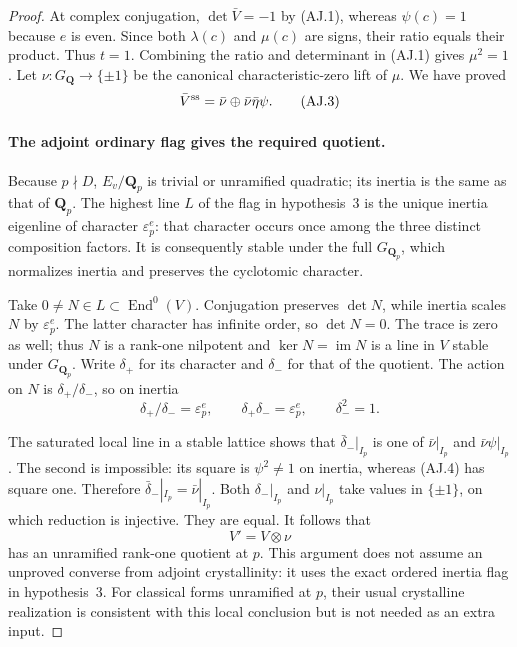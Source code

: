 \begin{proof}
At complex conjugation, $\det\bar V=-1$ by
(AJ.1), whereas $\psi(c)=1$ because $e$ is
even.  Since both $\lambda(c)$ and $\mu(c)$
are signs, their ratio equals their product.
Thus $t=1$.  Combining the ratio and determinant
in (AJ.1) gives $\mu^2=1$.
Let $\nu:G_{\mathbf Q}\to\{\pm1\}$ be the
canonical characteristic-zero lift of $\mu$.
We have proved
\[
          \bar V^{\rm ss}=
                  \bar\nu\oplus\bar\nu\bar\eta\psi.
                                                               \tag{AJ.3}
\]

\paragraph{The adjoint ordinary flag gives the required quotient.}
Because $p\nmid D$, $E_v/\mathbf Q_p$ is trivial
or unramified quadratic; its inertia is the same
as that of $\mathbf Q_p$.
The highest line $L$ of the flag in hypothesis~3
is the unique inertia eigenline of character
$\varepsilon_p^e$: that character occurs once
among the three distinct composition factors.
It is consequently stable under the full
$G_{\mathbf Q_p}$, which normalizes inertia and
preserves the cyclotomic character.

Take $0\ne N\in L\subset\operatorname{End}^0(V)$.
Conjugation preserves $\det N$, while inertia
scales $N$ by $\varepsilon_p^e$.  The latter
character has infinite order, so $\det N=0$.
The trace is zero as well; thus $N$ is a
rank-one nilpotent and
$\ker N=\operatorname{im}N$ is a line in $V$
stable under $G_{\mathbf Q_p}$.
Write $\delta_+$ for its character and
$\delta_-$ for that of the quotient.
The action on $N$ is $\delta_+/\delta_-$, so
on inertia
\[
 \delta_+/\delta_-=\varepsilon_p^e,
 \qquad \delta_+\delta_-=\varepsilon_p^e,
 \qquad \delta_-^2=1.                                    \tag{AJ.4}
\]

The saturated local line in a stable lattice
shows that $\bar\delta_-|_{I_p}$ is one of
$\bar\nu|_{I_p}$ and $\bar\nu\psi|_{I_p}$.
The second is impossible: its square is
$\psi^2\ne1$ on inertia, whereas (AJ.4) has
square one.  Therefore
$\bar\delta_-|_{I_p}=\bar\nu|_{I_p}$.
Both $\delta_-|_{I_p}$ and $\nu|_{I_p}$ take
values in $\{\pm1\}$, on which reduction is
injective.  They are equal.  It follows that
\[
                            V'=V\otimes\nu              \tag{AJ.5}
\]
has an unramified rank-one quotient at $p$.
This argument does not assume an unproved
converse from adjoint crystallinity: it uses
the exact ordered inertia flag in hypothesis~3.
For classical forms unramified at $p$, their
usual crystalline realization is consistent
with this local conclusion but is not needed
as an extra input.


\end{proof}

